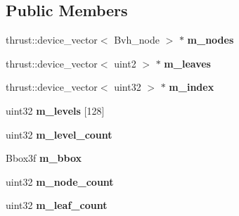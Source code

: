\subsection*{Public Members}
\begin{DoxyCompactItemize}
\item 
\mbox{\label{structnih_1_1cuda_1_1_sah__builder_a1172b22c18e8acefdfefe35dc300c204}} 
thrust\+::device\+\_\+vector$<$ Bvh\+\_\+node $>$ $\ast$ {\bfseries m\+\_\+nodes}
\item 
\mbox{\label{structnih_1_1cuda_1_1_sah__builder_a891274cfa4bd165b0d5e673202d0d296}} 
thrust\+::device\+\_\+vector$<$ uint2 $>$ $\ast$ {\bfseries m\+\_\+leaves}
\item 
\mbox{\label{structnih_1_1cuda_1_1_sah__builder_afe76284ecb556bc01ad05d123bf391b1}} 
thrust\+::device\+\_\+vector$<$ uint32 $>$ $\ast$ {\bfseries m\+\_\+index}
\item 
\mbox{\label{structnih_1_1cuda_1_1_sah__builder_af02a5191db284a1586f8ab77c6351637}} 
uint32 {\bfseries m\+\_\+levels} \mbox{[}128\mbox{]}
\item 
\mbox{\label{structnih_1_1cuda_1_1_sah__builder_a17aa7441bff68ee32e86d0efdb1058eb}} 
uint32 {\bfseries m\+\_\+level\+\_\+count}
\item 
\mbox{\label{structnih_1_1cuda_1_1_sah__builder_ab9045c8343d14d1da97701c1327d1875}} 
Bbox3f {\bfseries m\+\_\+bbox}
\item 
\mbox{\label{structnih_1_1cuda_1_1_sah__builder_a2c8d0b95c3ac84f0504d81b7fa405886}} 
uint32 {\bfseries m\+\_\+node\+\_\+count}
\item 
\mbox{\label{structnih_1_1cuda_1_1_sah__builder_a05f6533b879e14ef23b786924b41158a}} 
uint32 {\bfseries m\+\_\+leaf\+\_\+count}
\item 
\mbox{\label{structnih_1_1cuda_1_1_sah__builder_ad9bd0f99b5a7c59254111321608f8c86}} 

\end{DoxyCompactItemize}
